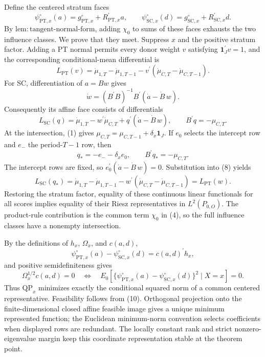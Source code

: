 Define the centered stratum faces
\[
 \psi^{\circ}_{\mathrm{PT},x}(a)=g^{\circ}_{\mathrm{PT},x}+R_{\mathrm{PT},x}^{\prime}a,
 \qquad
 \psi^{\circ}_{\mathrm{SC},x}(d)=g^{\circ}_{\mathrm{SC},x}+R_{\mathrm{SC},x}^{\prime}d.
 \tag{5}
\]
By \(\mathrm{lem{:}tangent\text{-}normal\text{-}form}\), adding \(\chi_0\) to sums of these faces exhausts the two influence classes.  We prove that they meet.  Suppress \(x\) and the positive stratum factor.  Adding a PT normal permits every donor weight \(v\) satisfying \(\mathbf 1_J^{\prime}v=1\), and the corresponding conditional-mean differential is
\[
 L_{\mathrm{PT}}(v)=\dot\mu_{1,T}-\dot\mu_{1,T-1}
 -v^{\prime}(\dot\mu_{C,T}-\dot\mu_{C,T-1}).
 \tag{6}
\]
For SC, differentiation of \(a=Bw\) gives
\[
 \dot w=(B^{\prime}B)^{-1}B^{\prime}(\dot a-\dot B\,w).
 \tag{7}
\]
Consequently its affine face consists of differentials
\[
 L_{\mathrm{SC}}(q)=\dot\mu_{1,T}-w^{\prime}\dot\mu_{C,T}
 +q^{\prime}(\dot a-\dot B\,w),
 \qquad B^{\prime}q=-\mu_{C,T}.
 \tag{8}
\]
At the intersection, (1) gives \(\mu_{C,T}=\mu_{C,T-1}+\delta_x\mathbf 1_J\).  If \(e_0\) selects the intercept row and \(e_-\) the period-\(T-1\) row, then
\[
 q_*=-e_- -\delta_xe_0,
 \qquad B^{\prime}q_*=-\mu_{C,T}.
 \tag{9}
\]
The intercept rows are fixed, so \(e_0^{\prime}(\dot a-\dot B\,w)=0\).  Substitution into (8) yields
\[
 L_{\mathrm{SC}}(q_*)
 =\dot\mu_{1,T}-\dot\mu_{1,T-1}
 -w^{\prime}(\dot\mu_{C,T}-\dot\mu_{C,T-1})
 =L_{\mathrm{PT}}(w).
 \tag{10}
\]
Restoring the stratum factor, equality of these continuous linear functionals for all scores implies equality of their Riesz representatives in \(L^2(P_{0,O})\).  The product-rule contribution is the common term \(\chi_0\) in (4), so the full influence classes have a nonempty intersection.

By the definitions of \(h_x\), \(\Omega_x\), and \(c(a,d)\),
\[
 \psi^{\circ}_{\mathrm{PT},x}(a)-\psi^{\circ}_{\mathrm{SC},x}(d)
 =c(a,d)^{\prime}h_x,
 \tag{11}
\]
and positive semidefiniteness gives
\[
 \Omega_x^{1/2}c(a,d)=0
 \quad\Longleftrightarrow\quad
 E_0[\{\psi^{\circ}_{\mathrm{PT},x}(a)-\psi^{\circ}_{\mathrm{SC},x}(d)\}^2\mid X=x]=0.
 \tag{12}
\]
Thus \(\mathrm{QP}_x\) minimizes exactly the conditional squared norm of a common centered representative.  Feasibility follows from (10).  Orthogonal projection onto the finite-dimensional closed affine feasible image gives a unique minimum represented function; the Euclidean minimum-norm convention selects coefficients when displayed rows are redundant.  The locally constant rank and strict nonzero-eigenvalue margin keep this coordinate representation stable at the theorem point.

